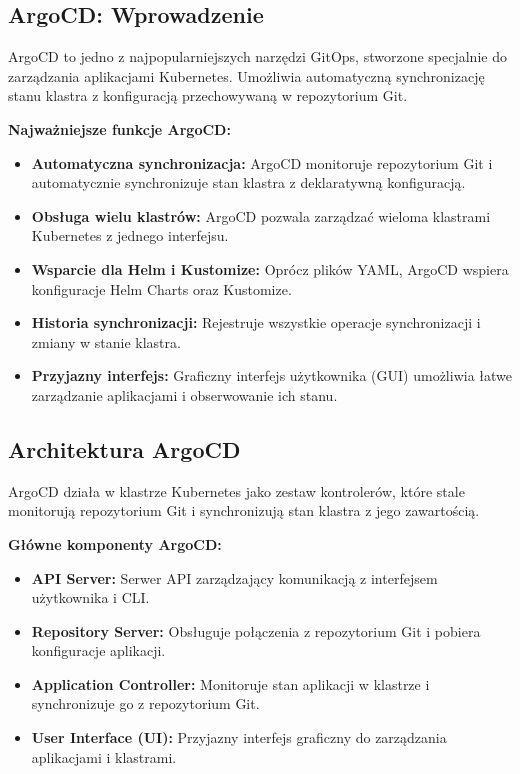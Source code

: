 \documentclass{article}
\begin{document}
\subsection{ArgoCD: Wprowadzenie}

ArgoCD to jedno z najpopularniejszych narzędzi GitOps, stworzone specjalnie do zarządzania aplikacjami Kubernetes. Umożliwia automatyczną synchronizację stanu klastra z konfiguracją przechowywaną w repozytorium Git.

\textbf{Najważniejsze funkcje ArgoCD:}
\begin{itemize}
    \item \textbf{Automatyczna synchronizacja:} ArgoCD monitoruje repozytorium Git i automatycznie synchronizuje stan klastra z deklaratywną konfiguracją.
    \item \textbf{Obsługa wielu klastrów:} ArgoCD pozwala zarządzać wieloma klastrami Kubernetes z jednego interfejsu.
    \item \textbf{Wsparcie dla Helm i Kustomize:} Oprócz plików YAML, ArgoCD wspiera konfiguracje Helm Charts oraz Kustomize.
    \item \textbf{Historia synchronizacji:} Rejestruje wszystkie operacje synchronizacji i zmiany w stanie klastra.
    \item \textbf{Przyjazny interfejs:} Graficzny interfejs użytkownika (GUI) umożliwia łatwe zarządzanie aplikacjami i obserwowanie ich stanu.
\end{itemize}

\subsection{Architektura ArgoCD}

ArgoCD działa w klastrze Kubernetes jako zestaw kontrolerów, które stale monitorują repozytorium Git i synchronizują stan klastra z jego zawartością. 

\textbf{Główne komponenty ArgoCD:}
\begin{itemize}
    \item \textbf{API Server:} Serwer API zarządzający komunikacją z interfejsem użytkownika i CLI.
    \item \textbf{Repository Server:} Obsługuje połączenia z repozytorium Git i pobiera konfiguracje aplikacji.
    \item \textbf{Application Controller:} Monitoruje stan aplikacji w klastrze i synchronizuje go z repozytorium Git.
    \item \textbf{User Interface (UI):} Przyjazny interfejs graficzny do zarządzania aplikacjami i klastrami.
\end{itemize}
\end{document}

